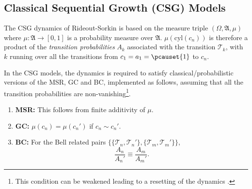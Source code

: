\documentclass[11pt]{article}
\newcommand{\cyl}[1]{{\mathrm{cyl}({#1})}}
\newcommand{\cT}{\mathcal T}
\newcommand{\rt}{\rightarrow}
\newcommand{\fA}{\mathfrak A}
\begin{document}
\subsection{Classical Sequential Growth (CSG) Models}
\label{csg.ssec}

The CSG dynamics of Rideout-Sorkin is based on the measure triple
$(\Omega, \fA, \mu)$ where  $\mu: \fA \rt [0,1]$ is a probability
measure over $\fA$. $\mu(\cyl{c_n})$ is therefore a product of the 
{\sl transition probabilities} $A_k$ associated with the transition
$\cT_k$, with $k$ running over all the transitions from $c_1=a_1=\pcauset{1}$ to $c_n$.  


In the CSG models, the dynamics is  required to satisfy
classical/probabilistic versions of the MSR, GC and BC, implemented as
follows, assuming that all the transition probabilities are
non-vanishing\footnote{This condition can be weakened leading to a
  resetting of the dynamics  \cite{rv,dsobs}.}.

\begin{enumerate}
\item {\bf  MSR:}  This follows from finite additivity of $\mu$.   
\item {\bf GC:} $\mu(c_n)=\mu(c_n')$ if  $c_n \sim c_n'$.  
  \item {\bf BC:} For the Bell related pairs
    $\{\{\cT_n,\cT_n'\}, \{ \cT_m,\cT_m'\}\}$,
   \begin{equation} \frac{A_n}{A_n'} \equiv
     \frac{A_m}{A_m'} .  \label{CBC.eq}
   \end{equation}
   \label{csgbc.eq} 
  \end{enumerate} 
\end{document}
